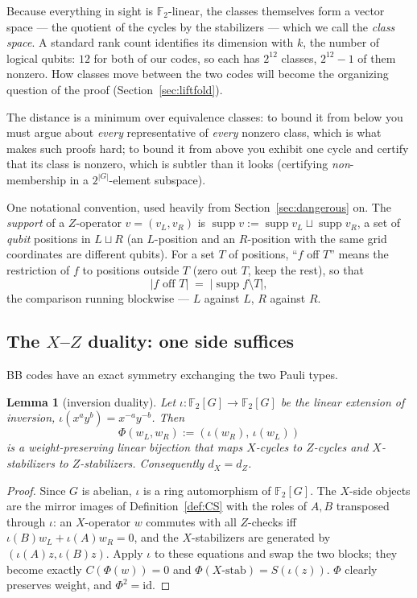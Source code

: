 \documentclass[11pt]{article}
\theoremstyle{plain}
\newtheorem{lemma}[theorem]{Lemma}
\theoremstyle{definition}
\theoremstyle{remark}
\newcommand{\F}{\mathbb{F}}
\newcommand{\suppop}{\operatorname{supp}}
\newcommand{\wt}[1]{\lvert #1\rvert}
\begin{document}
Because everything in sight is $\F_2$-linear, the classes themselves form a
vector space --- the quotient of the cycles by the stabilizers --- which we
call the \emph{class space}. A standard rank count identifies its dimension
with $k$, the number of logical qubits: $12$ for both of our codes, so each
has $2^{12}$ classes, $2^{12} - 1$ of them nonzero. How classes move between
the two codes will become the organizing question of the proof
(Section~\ref{sec:liftfold}).

The distance is a minimum over equivalence classes: to bound it from below you
must argue about \emph{every} representative of \emph{every} nonzero class,
which is what makes such proofs hard; to bound it from above you exhibit one
cycle and certify that its class is nonzero, which is subtler than it looks
(certifying \emph{non}-membership in a $2^{|G|}$-element subspace).

One notational convention, used heavily from Section~\ref{sec:dangerous}
on. The \emph{support} of a $Z$-operator $v = (v_L, v_R)$ is
$\suppop v := \suppop v_L \sqcup \suppop v_R$, a set of \emph{qubit}
positions in $L \sqcup R$ (an $L$-position and an $R$-position with the
same grid coordinates are different qubits). For a set $T$ of positions,
``$f$ off $T$'' means the restriction of $f$ to positions outside $T$
(zero out $T$, keep the rest), so that
\[
\wt{f \text{ off } T} \;=\; \lvert \suppop f \setminus T \rvert ,
\]
the comparison running blockwise --- $L$ against $L$, $R$ against $R$.

\subsection{The \texorpdfstring{$X$--$Z$}{X-Z} duality: one side suffices}

BB codes have an exact symmetry exchanging the two Pauli types.

\begin{lemma}[inversion duality]\label{lem:duality}
Let $\iota : \F_2[G] \to \F_2[G]$ be the linear extension of inversion,
$\iota(x^ay^b) = x^{-a}y^{-b}$. Then
\[
\Phi(w_L, w_R) := (\iota(w_R),\, \iota(w_L))
\]
is a weight-preserving linear bijection that maps $X$-cycles to $Z$-cycles and
$X$-stabilizers to $Z$-stabilizers. Consequently $d_X = d_Z$.
\end{lemma}

\begin{proof}
Since $G$ is abelian, $\iota$ is a ring automorphism of $\F_2[G]$. The
$X$-side objects are the mirror images of Definition~\ref{def:CS} with the
roles of $A, B$ transposed through $\iota$: an $X$-operator $w$ commutes with
all $Z$-checks iff $\iota(B) w_L + \iota(A) w_R = 0$, and the $X$-stabilizers
are generated by $(\iota(A) z, \iota(B) z)$. Apply $\iota$ to these equations
and swap the two blocks; they become exactly $C(\Phi(w)) = 0$ and
$\Phi(\text{$X$-stab}) = S(\iota(z))$. $\Phi$ clearly preserves weight, and
$\Phi^2 = \mathrm{id}$.
\end{proof}
\end{document}
